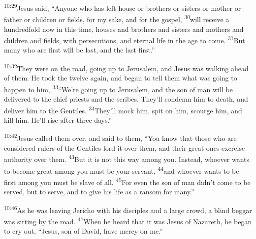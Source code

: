 \documentclass[openany,12pt,english]{book}
\newenvironment{para}{\par\pretolerance=100\tolerance=200\setlength{\emergencystretch}{0.6em}\relax}{\par}
\begin{document}
\begin{para}
    \textsuperscript{10:29}\thinspace{}Jesus said, “Any\-one who has left house or brothers or sisters or moth\-er or fa\-ther or chil\-dren or fields, for my sa\-ke, and for the gos\-pel,
    \textsuperscript{30}\thinspace{}will re\-ceive a hun\-dred\-fold now in this time, hous\-es and brothers and sisters and mothers and chil\-dren and fields, with persecutions, and e\-ter\-nal life in the age to come.
    \textsuperscript{31}\thinspace{}But man\-y who are first will be last, and the last first.”
\end{para}

\bigskip{}

\begin{para}
    \textsuperscript{10:32}\thinspace{}They were on the road, go\-ing up to Je\-ru\-sa\-lem, and Jesus was walk\-ing a\-head of them. He took the twelve a\-gain, and be\-gan to tell them what was go\-ing to hap\-pen to him,
    \textsuperscript{33}\thinspace{}“We're go\-ing up to Je\-ru\-sa\-lem, and the son of man will be delivered to the chief priests and the scribes. They'll con\-demn him to death, and de\-liv\-er him to the Gentiles.
    \textsuperscript{34}\thinspace{}They'll mock him, spit on him, scourge him, and kill him. He'll rise af\-ter three days.”
\end{para}

\bigskip{}

\begin{para}
    \textsuperscript{10:42}\thinspace{}Jesus called them over, and said to them, “You know that those who are con\-sid\-ered rulers of the Gentiles lord it over them, and their great ones ex\-er\-cise au\-thor\-i\-ty over them.
    \textsuperscript{43}\thinspace{}But it is not this way a\-mong you. In\-stead, who\-ev\-er wants to be\-come great a\-mong you must be your serv\-ant,
    \textsuperscript{44}\thinspace{}and who\-ev\-er wants to be first a\-mong you must be slave of all.
    \textsuperscript{45}\thinspace{}For e\-ven the son of man did\-n't come to be served, but to serve, and to give his life as a ran\-som for man\-y.”
\end{para}

\bigskip{}

\begin{para}
    \textsuperscript{10:46}\thinspace{}As he was leav\-ing Jericho with his disciples and a large crowd, a blind beg\-gar was sit\-ting by the road.
    \textsuperscript{47}\thinspace{}When he heard that it was Jesus of Na\-za\-reth, he be\-gan to cry out, “Jesus, son of David, have mer\-cy on me.”
\end{para}
\end{document}
